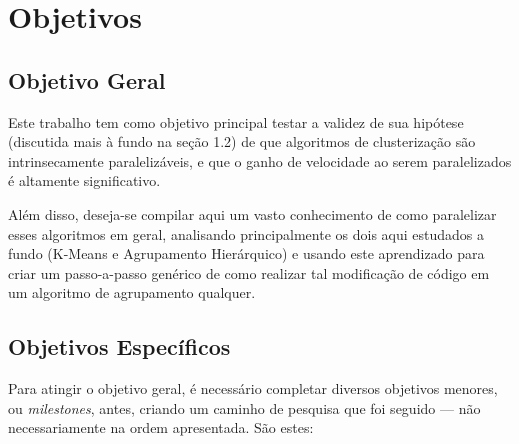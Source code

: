 \documentclass[12pt,
openright, 
oneside, %
a4paper,    %
brazil]{facom-ufu-abntex2}
\def\qntAlgrtm{dois}
\begin{document}




\section{Objetivos}




\subsection{Objetivo Geral}

Este trabalho tem como objetivo principal testar a validez de sua hipótese (discutida mais à fundo na seção 1.2) de que algoritmos de clusterização são intrinsecamente paralelizáveis, e que o ganho de velocidade ao serem paralelizados é altamente significativo.

Além disso, deseja-se compilar aqui um vasto conhecimento de como paralelizar esses algoritmos em geral, analisando principalmente os \qntAlgrtm{} aqui estudados a fundo (K-Means e Agrupamento Hierárquico) e usando este aprendizado para criar um passo-a-passo genérico de como realizar tal modificação de código em um algoritmo de agrupamento qualquer.




\subsection{Objetivos Específicos}

Para atingir o objetivo geral, é necessário completar diversos objetivos menores, ou \textit{milestones}, antes, criando um caminho de pesquisa que foi seguido --- não necessariamente na ordem apresentada. São estes:
\end{document}
